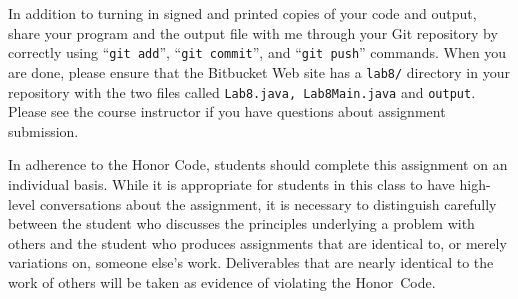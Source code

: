 \noindent In addition to turning in signed and printed copies of your code and output, share your program and the output
file with me through your Git repository by correctly using ``{\tt git add}'', ``{\tt git commit}'', and ``{\tt git
  push}'' commands. When you are done, please ensure that the Bitbucket Web site has a {\tt lab8/} directory in your
repository with the two files called {\tt Lab8.java, Lab8Main.java} and {\tt output}. Please see the course instructor
if you have questions about assignment submission.


In adherence to the Honor Code, students should complete this assignment on an individual basis. While it is appropriate
for students in this class to have high-level conversations about the assignment, it is necessary to distinguish
carefully between the student who discusses the principles underlying a problem with others and the student who produces
assignments that are identical to, or merely variations on, someone else's work.  Deliverables that are nearly identical
to the work of others will be taken as evidence of violating the \mbox{Honor Code}.  



